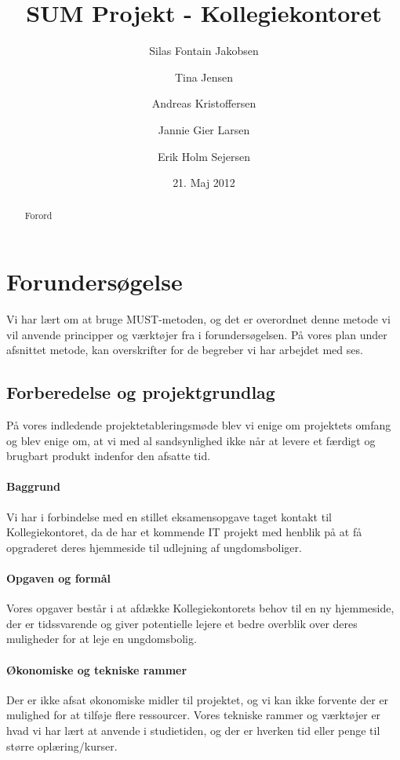\documentclass[12pt, a4paper]{report}
\title{SUM Projekt - Kollegiekontoret}
\author{Silas Fontain Jakobsen \and Tina Jensen \and Andreas Kristoffersen \and Jannie Gier Larsen \and Erik Holm Sejersen}
\date{21. Maj 2012}
\begin{document}
\begin{titlepage}
\maketitle
\end{titlepage}

\begin{abstract}
Forord
\end{abstract}

\tableofcontents

\chapter{Forundersøgelse}


Vi har lært om at bruge MUST-metoden, og det er overordnet denne metode vi vil anvende principper og værktøjer fra i forundersøgelsen. På vores plan under afsnittet metode, kan overskrifter for de begreber vi har arbejdet med ses.

\section{Forberedelse og projektgrundlag}
På vores indledende projektetableringsmøde blev vi enige om projektets omfang og blev enige om, at vi med al sandsynlighed ikke når at levere et færdigt og brugbart produkt indenfor den afsatte tid.

\subsubsection{Baggrund}
Vi har i forbindelse med en stillet eksamensopgave taget kontakt til Kollegiekontoret, da de har et kommende IT projekt med henblik på at få opgraderet deres hjemmeside til udlejning af ungdomsboliger.

\subsubsection{Opgaven og formål}
Vores opgaver består i at afdække Kollegiekontorets behov til en ny hjemmeside, der er tidssvarende og giver potentielle lejere et bedre overblik over deres muligheder for at leje en ungdomsbolig.

\subsubsection{Økonomiske og tekniske rammer}
Der er ikke afsat økonomiske midler til projektet, og vi kan ikke forvente der er mulighed for at tilføje flere ressourcer. Vores tekniske rammer og værktøjer er hvad vi har lært at anvende i studietiden, og der er hverken tid eller penge til større oplæring/kurser.
\end{document}

